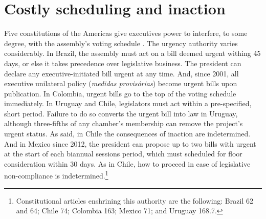 \documentclass[letter,12pt]{article}
\newcommand{\emm}[1]{\todo[color=blue!30, inline]{\textbf{To do:} #1}}
\begin{document}
\section{Costly scheduling and inaction}

Five constitutions of the Americas give executives power to interfere, to some degree, with the assembly's voting schedule \citep{morgenstern.2002b}. The urgency authority varies considerably. In Brazil, the assembly must act on a bill deemed urgent withing 45 days, or else it takes precedence over legislative business. The president can declare any executive-initiated bill urgent at any time. And, since 2001, all executive unilateral policy (\emph{medidas provis\'orias}) become urgent bills upon publication. In Colombia, urgent bills go to the top of the voting schedule immediately. In Uruguay and Chile, legislators must act within a pre-specified, short period. Failure to do so converts the urgent bill into law in Uruguay, although three-fifths of any chamber's membership can remove the project's urgent status. As said, in Chile the consequences of inaction are indetermined. And in Mexico since 2012, the president can propose up to two bills with urgent at the start of each biannual sessions period, which must scheduled for floor consideration within 30 days. As in Chile, how to proceed in case of legislative non-compliance is indetermined.\footnote{Constitutional articles enshrining this authority are the following: Brazil 62 and 64; Chile 74; Colombia 163; Mexico 71; and Uruguay 168.7.}

\end{document}
